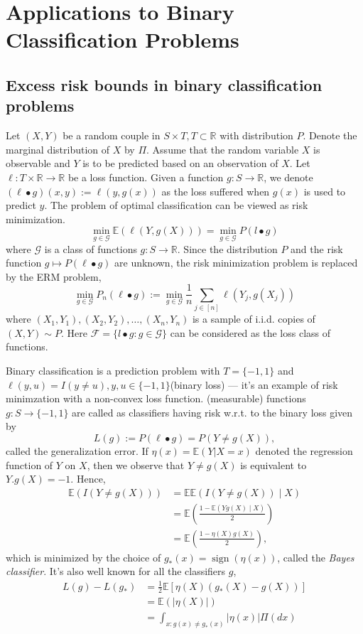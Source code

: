 \section{Applications to Binary Classification Problems}\label{sec:excessrisk}
\subsection{Excess risk bounds in binary classification problems}
Let $(X,Y)$ be a random couple in $S\times T, T\subset\mathbb{R}$ with distribution $P$. Denote the marginal distribution of $X$ by $\Pi$. Assume that the random variable $X$ is observable and $Y$ is to be predicted based on an observation of $X$. Let $\ell:T\times \mathbb{R}\to \mathbb{R}$ be a loss function. Given a function $g:S\to \mathbb{R}$, we denote $(\ell \bullet g)(x,y):= \ell(y,g(x))$ as the loss suffered when $g(x)$ is used to predict $y$. The problem of optimal classification can be viewed as risk minimization.
$$
  \min_{g \in \mathcal{G}}\mathbb{E}(\ell(Y,g(X)))=\min_{g \in \mathcal{G}}P(l \bullet g)
$$
where $\mathcal{G}$ is a class of functions $g : S\to \mathbb{R}$. Since the distribution $P$ and the risk function $g \mapsto P(\ell \bullet g)$ are unknown, the risk minimization problem is replaced by the ERM problem,
$$
  \min_{g \in \mathcal{G}}P_n(\ell \bullet g):= \min_{g \in \mathcal{G}}\frac{1}{n}\sum_{j \in [n]}\ell(Y_j,g(X_j))
$$
where $(X_1,Y_1),(X_2,Y_2),\ldots,(X_n,Y_n)$ is a sample of i.i.d. copies of $(X,Y)\sim P$. Here $\mathcal{F}=\{l \bullet g:g\in \mathcal{G}\}$ can be considered as the loss class of functions.

Binary classification is a prediction problem with $T=\{-1,1\}$ and $\ell (y,u)=I(y\neq u),y,u\in \{-1,1\}$(binary loss) --- it's an example of risk minimzation with a non-convex loss function. (measurable) functions $g:S \to \{-1,1\}$ are called as classifiers having risk w.r.t. to the binary loss given by
$$
  L(g):=P(\ell \bullet g)=P(Y\neq g(X)),
$$
called the generalization error. If $\eta(x)=\mathbb{E}(Y|X=x)$ denoted the regression function of $Y$ on $X$, then we observe that $Y\neq g(X)$ is equivalent to $Y.g(X)=-1$. Hence,
\begin{align*}
  \mathbb{E}(I(Y\neq g(X))) & =\mathbb{E}\mathbb{E}(I(Y \neq g(X))\mid X)                   \\
                            & = \mathbb{E}\left(\frac{1-\mathbb{E}(Y g(X)\mid X)}{2}\right) \\
                            & = \mathbb{E}\left( \frac{1-\eta(X)g(X)}{2}\right),
\end{align*}
which is minimized by the choice of $g_*(x)=\operatorname{sign}(\eta(x))$, called the \textit{Bayes classifier}. It's also well known for all the classifiers $g$,
\begin{align}
  L(g)-L(g_*) & = \frac{1}{2}\mathbb{E}[\eta(X)(g_*(X)-g(X))]                                  \\
              & =\mathbb{E}(|\eta(X)|)                                                         \\
              & =\int_{x:g(x)\neq g_*(x)}|\eta(x)|\Pi(dx)\label{formula: excess risk integral}
\end{align}

